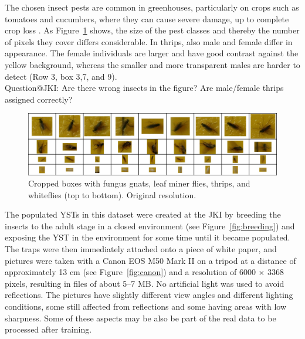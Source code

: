 \documentclass[12pt,a4paper]{article}
\begin{document}
The chosen insect pests are common in greenhouses, particularly on crops such as tomatoes and cucumbers, where they can cause severe damage, up to complete crop loss \cite{rustia_automatic_2021}. As Figure~\ref{fig:example_insects} shows, the size of the pest classes and thereby the number of pixels they cover differs considerable. In thrips, also male and female differ in appearance. The female individuals are larger and have good contrast against the yellow background, whereas the smaller and more transparent males are harder to detect (Row 3, box 3,7, and 9). \\
{\color{red} Question@JKI: Are there wrong insects in the figure? Are male/female thrips assigned correctly?}

\begin{figure}[H]  %
    \centering
    \includegraphics[width=1.0\textwidth]{images/figure2.jpg}  %
    \caption{Cropped boxes with fungus gnats, leaf miner flies, thrips, and whiteflies (top to bottom). Original resolution.}
    \label{fig:example_insects}
\end{figure}

The populated YSTs in this dataset were created at the JKI by breeding the insects to the adult stage in a closed environment (see Figure~\ref{fig:breeding}) and exposing the YST in the environment for some time until it became populated. The traps were then immediately attached onto a piece of white paper, and pictures were taken with a Canon EOS M50 Mark II on a tripod at a distance of approximately 13 cm (see Figure~\ref{fig:canon}) and a resolution of 6000 × 3368 pixels, resulting in files of about 5–7 MB. No artificial light was used to avoid reflections. The pictures have slightly different view angles and different lighting conditions, some still affected from reflections and some having areas with low sharpness. Some of these aspects may be also be part of the real data to be processed after training.
\end{document}
